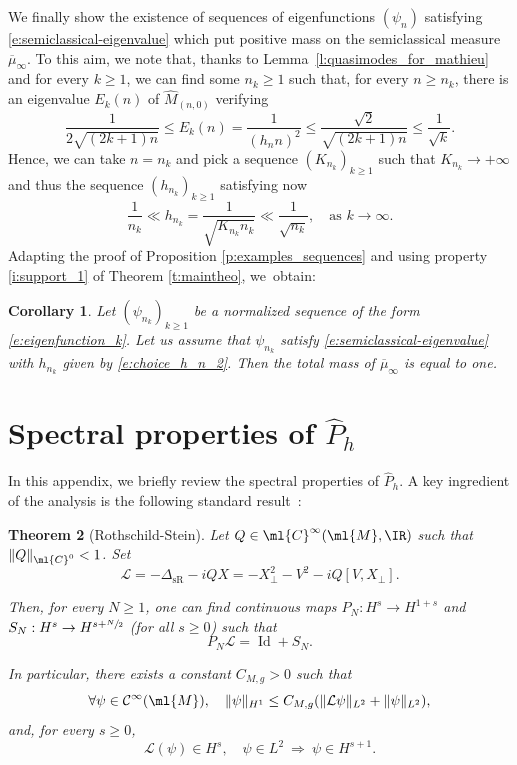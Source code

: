 \documentclass[JEP,XML,SOM,Unicode, NoEqCountersInSection,published]{cedram}
\theoremstyle{plain}
\newtheorem{theo}{Theorem}[section]
\newtheorem{coro}[theo]{Corollary}
\theoremstyle{definition}
\theoremstyle{remark}
\begin{document}
We finally show the existence of sequences of eigenfunctions $(\psi_n)$ satisfying \eqref{e:semiclassical-eigenvalue} which put positive mass on the semiclassical measure $\overline{\mu}_\infty$. To this aim, we note that, thanks to Lemma~\ref{l:quasimodes_for_mathieu} and for every $k\geq 1$, we can find some $n_k\geq 1$ such that, for every $n\geq n_k$, there is an eigenvalue $E_k(n)$ of $\widehat{M}_{(n,0)}$ verifying
\[
\frac{1}{2\sqrt{(2k+1)n}}\leq E_k(n)=\frac{1}{(h_nn)^2}\leq\frac{\sqrt{2}}{\sqrt{(2k+1)n}}\leq \frac{1}{\sqrt{k}}.
\]
Hence, we can take $n=n_k$ and pick a sequence $(K_{n_k})_{k\geq 1}$ such that $K_{n_k} \to + \infty$ and thus the sequence $(h_{n_k})_{k\geq 1}$ satisfying now
\begin{equation}
\label{e:choice_h_n_2}
\frac{1}{n_k}\ll h_{n_k} = \frac{1}{\sqrt{K_{n_k} n_k }}\ll \frac{1}{\sqrt{n_k}}, \quad \text{as } k \to \infty.
\end{equation}
Adapting the proof of Proposition \ref{p:examples_sequences} and using property \eqref{i:support_1} of Theorem \ref{t:maintheo}, we~obtain:
\begin{coro}
\label{c:examples_sequences}
Let $(\psi_{n_k})_{k\geq 1}$ be a normalized sequence of the form \eqref{e:eigenfunction_k}. Let us assume that $\psi_{n_k}$ satisfy \eqref{e:semiclassical-eigenvalue} with $h_{n_k}$ given by \eqref{e:choice_h_n_2}. Then the total mass of $\overline{\mu}_\infty$ is equal to one.
\end{coro}

\appendix

\section{Spectral properties of \texorpdfstring{$\widehat{P}_h$}{Ph}}
\label{a:spectral}

In this appendix, we briefly review the spectral properties of $\widehat{P}_h$. A key ingredient of the analysis is the following standard result~\cite[Cor.\,17.14]{RothschildStein76}:

\begin{theo}[Rothschild-Stein]\label{t:RothschildStein} Let $Q\in\ml{C}^\infty(\ml{M},\IR)$ such that $\|Q\|_{\ml{C}^0}<1$. Set
\[
\mathcal{L}=-\Delta_{\text{sR}}-iQX=-X_\perp^2-V^2-iQ[V,X_\perp].
\]

Then, for every $N\geq 1$, one can find continuous maps $P_N:H^s\to H^{1+s}$ and $S_N:H^s\to H^{s+\sfrac{N}{2}}$ (for all $s\geq 0$) such that
\[
P_N\mathcal{L}=\operatorname{Id}+S_N.
\]

In particular, there exists a constant $C_{M,g}>0$ such that
\begin{equation}\label{e:RothschildStein}
\forall \psi\in\mathcal{C}^\infty(\ml{M}),\quad\|\psi\|_{H^1}\leq C_{M,g}(\|\mathcal{L}\psi\|_{L^2}+\|\psi\|_{L^2}),
\end{equation}
and, for every $s\geq 0$,
\[
\mathcal{L}(\psi)\in H^s,\quad\psi\in L^2\ \Longrightarrow\ \psi\in H^{s+1}.
\]
\end{theo}
\end{document}
